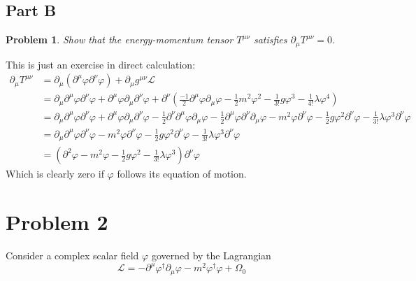 \documentclass[fontsize=11pt]{scrartcl} %
\numberwithin{equation}{section} %
\numberwithin{figure}{section} %
\numberwithin{table}{section} %
\newtheorem*{problem}{Problem}
\begin{document}
\newpage

\subsection*{Part B}

\begin{problem}
    Show that the energy-momentum tensor $T^{\mu\nu}$ satisfies
    $\partial_{\mu}T^{\mu\nu}=0$.
\end{problem}

This is just an exercise in direct calculation:
\[
    \begin{aligned}
        \partial_{\mu}T^{\mu\nu} &=
        \partial_{\mu}\left( \partial^{\mu}\varphi\partial^{\nu}\varphi \right)
        +\partial_{\mu}g^{\mu\nu}\mathscr{L}\\
        &=
        \partial_{\mu}\partial^{\mu}\varphi\partial^{\nu}\varphi
        +\partial^{\mu}\varphi\partial_{\mu}\partial^{\nu}\varphi
        +\partial^{\nu}
        \left(\frac{-1}{2}\partial^{\mu}\varphi\partial_{\mu}\varphi -
        \frac{1}{2}m^2\varphi^2 - \frac{1}{3!}g\varphi^3 -
        \frac{1}{4!}\lambda\varphi^4\right)\\
        &=
        \partial_{\mu}\partial^{\mu}\varphi\partial^{\nu}\varphi
        +\partial^{\mu}\varphi\partial_{\mu}\partial^{\nu}\varphi
        -\frac{1}{2}\partial^{\nu}\partial^{\mu}\varphi\partial_{\mu}\varphi 
        -\frac{1}{2}\partial^{\mu}\varphi\partial^{\nu}\partial_{\mu}\varphi
        -m^2\varphi\partial^{\nu}\varphi
        -\frac{1}{2}g\varphi^2\partial^{\nu}\varphi
        -\frac{1}{3!}\lambda\varphi^3\partial^{\nu}\varphi\\
        &=
        \partial_{\mu}\partial^{\mu}\varphi\partial^{\nu}\varphi
        -m^2\varphi\partial^{\nu}\varphi
        -\frac{1}{2}g\varphi^2\partial^{\nu}\varphi
        -\frac{1}{3!}\lambda\varphi^3\partial^{\nu}\varphi\\
        &=
        \left(
            \partial^2\varphi
            -m^2\varphi
            -\frac{1}{2}g\varphi^2
            -\frac{1}{3!}\lambda\varphi^3
        \right)\partial^{\nu}\varphi
    \end{aligned}
\]
Which is clearly zero if $\varphi$ follows its equation of motion.


\newpage
\section*{Problem 2}
Consider a complex scalar field $\varphi$ governed by the Lagrangian
\[
    \mathscr{L} = -\partial^{\mu}\varphi^{\dagger}\partial_{\mu}\varphi -
    m^2\varphi^{\dagger}\varphi + \Omega_0
\]
\end{document}
